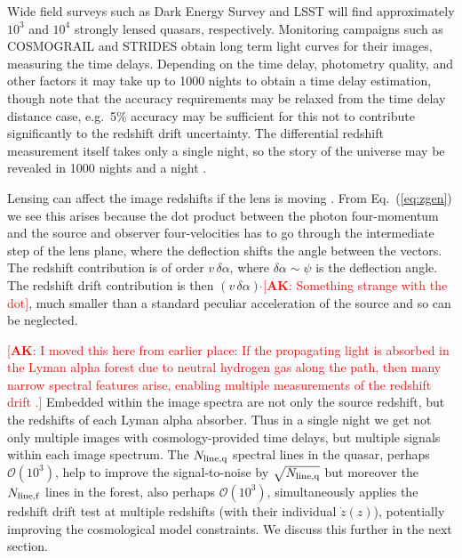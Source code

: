\documentclass[preprint2, 10pt]{aastex}
\newcommand{\alex}[1]{\textcolor{red}{[{\bf AK}: #1]}}
\begin{document}
Wide field surveys such as Dark Energy Survey and LSST will find 
approximately $10^3$ and $10^4$ strongly lensed quasars, respectively.  
Monitoring 
campaigns such as COSMOGRAIL \citep{cosmograil} and STRIDES \citep{strides} 
obtain long term light curves for their images, measuring the time 
delays.  Depending on the time delay, photometry quality, and other 
factors it may take up to 1000 nights to obtain a time delay 
estimation, though note that the accuracy requirements may be relaxed 
from the time delay distance case, e.g.\ 5\% accuracy may be sufficient 
for this not to contribute significantly to the redshift drift uncertainty. 
The differential redshift measurement itself takes only a single night, 
so the story of the universe may be revealed in 1000 nights and a night 
\citep{1001}. 

Lensing can affect the image redshifts if the lens is moving 
\citep{mitrofanov,birkgull}.  From 
Eq.~(\ref{eq:zgen}) we see this arises because the dot product between 
the photon four-momentum and the source and observer four-velocities 
has to go through the intermediate step of the lens plane, where the 
deflection shifts the angle between the vectors.  The redshift contribution 
is of order $v\,\delta\alpha$, where $\delta\alpha\sim\psi$ is the 
deflection angle.  The redshift drift contribution is then 
$(v\,\delta\alpha)\,\dot{}$\alex{Something strange with the dot}, much smaller than a standard peculiar 
acceleration of the source and so can be neglected. 

\alex{I moved this here from earlier place: If the propagating light is 
absorbed in the Lyman alpha forest due to neutral hydrogen gas along 
the path, then many narrow spectral features arise, enabling multiple 
measurements of the redshift drift \citep{2008MNRAS.386.1192L}.}
Embedded within the image spectra are not only the source redshift, but 
the redshifts of each Lyman alpha absorber.  Thus in a single night we get 
not only multiple images with cosmology-provided time delays, but multiple 
signals within each image spectrum.  The $N_{\rm line,q}$ spectral lines 
in the quasar, perhaps ${\mathcal O}(10^3)$, help to improve the 
signal-to-noise by $\sqrt{N_{\rm line,q}}$ but moreover the 
$N_{\rm line,f}$ lines in the forest, also perhaps ${\mathcal O}(10^3)$, 
simultaneously applies the redshift drift test at multiple redshifts 
(with their individual $\dot z(z)$), potentially improving the cosmological 
model constraints.  We discuss this further in the next section. 


\end{document}
